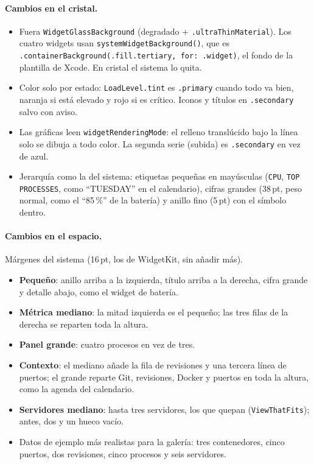 \documentclass[11pt,a4paper]{article}
\begin{document}
\paragraph{Cambios en el cristal.}
\begin{itemize}
  \item Fuera \texttt{WidgetGlassBackground} (degradado +
    \texttt{.ultraThinMaterial}). Los cuatro widgets usan
    \texttt{systemWidgetBackground()}, que es
    \texttt{.containerBackground(.fill.tertiary, for: .widget)}, el
    fondo de la plantilla de Xcode. En cristal el sistema lo quita.
  \item Color solo por estado: \texttt{LoadLevel.tint} es
    \texttt{.primary} cuando todo va bien, naranja si está elevado y
    rojo si es crítico. Iconos y títulos en \texttt{.secondary} salvo
    con aviso.
  \item Las gráficas leen \texttt{widgetRenderingMode}: el relleno
    translúcido bajo la línea solo se dibuja a todo color. La segunda
    serie (subida) es \texttt{.secondary} en vez de azul.
  \item Jerarquía como la del sistema: etiquetas pequeñas en mayúsculas
    (\texttt{CPU}, \texttt{TOP PROCESSES}, como ``TUESDAY'' en el
    calendario), cifras grandes (38\,pt, peso normal, como el ``85\,\%''
    de la batería) y anillo fino (5\,pt) con el símbolo dentro.
\end{itemize}

\paragraph{Cambios en el espacio.} Márgenes del sistema (16\,pt, los de
WidgetKit, sin añadir más).
\begin{itemize}
  \item \textbf{Pequeño}: anillo arriba a la izquierda, título arriba a
    la derecha, cifra grande y detalle abajo, como el widget de
    batería.
  \item \textbf{Métrica mediano}: la mitad izquierda es el pequeño; las
    tres filas de la derecha se reparten toda la altura.
  \item \textbf{Panel grande}: cuatro procesos en vez de tres.
  \item \textbf{Contexto}: el mediano añade la fila de revisiones y una
    tercera línea de puertos; el grande reparte Git, revisiones, Docker
    y puertos en toda la altura, como la agenda del calendario.
  \item \textbf{Servidores mediano}: hasta tres servidores, los que
    quepan (\texttt{ViewThatFits}); antes, dos y un hueco vacío.
  \item Datos de ejemplo más realistas para la galería: tres
    contenedores, cinco puertos, dos revisiones, cinco procesos y seis
    servidores.
\end{itemize}
\end{document}
